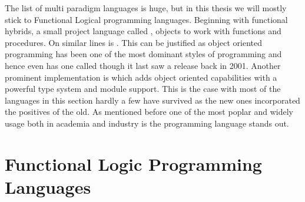 \documentclass[thesis-solanki.tex]{subfiles}
\begin{document}
The list of multi paradigm languages is huge, but in this thesis we will mostly stick to Functional Logical programming languages. Beginning with functional hybrids, a small project language called  \cite{website:virgil}, 
objects to work with functions and procedures.
On similar lines is  \cite{website:closwiki}.
This can be justified as object oriented programming has been one of the most dominant styles of programming and
hence even  has one called  \cite{website:ohaskell} though it last saw a
release back in 2001.
Another prominent implementation is  \cite{website:ocamlwiki,website:ocamllang} which adds object
oriented capabilities with a powerful type system and module support.
This is the case with most of the languages in this section hardly a few have survived as the new ones incorporated
the positives of the old.
As mentioned before one of the most poplar \cite{website:langpop} and widely usage both in academia and industry is
the  \cite{website:scala} programming language stands out.


\section{Functional Logic Programming Languages}
\end{document}

